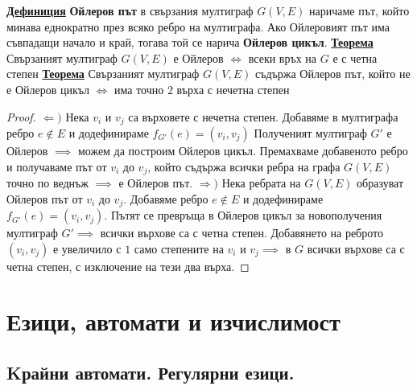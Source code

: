 \documentclass{article}
\begin{document}
\textbf{\underline{Дефиниция}}
\textbf{Ойлеров път} в свързания мултиграф $G(V, E)$ наричаме път, който минава еднократно през всяко ребро на мултиграфа.
Ако Ойлеровият път има съвпадащи начало и край, тогава той се нарича \textbf{Ойлеров цикъл}. \newline\newline
\textbf{\underline{Теорема}} \newline
Свързаният мултиграф $G(V, E)$ е Ойлеров $\iff$ всеки връх на $G$ е с четна степен \newline\newline
\textbf{\underline{Теорема}} \newline
Свързаният мултиграф $G(V, E)$ съдържа Ойлеров път, който не е Ойлеров цикъл $\iff$ има точно $2$ върха с нечетна степен
\begin{proof}
$\Leftarrow)$ Нека $v_i$ и $v_j$ са върховете с нечетна степен. Добавяме в мултиграфа ребро $e \notin E$ и додефинираме
$f_{G'}(e) = (v_i, v_j)$ Полученият мултиграф $G'$ е Ойлеров $\implies$ можем да построим Ойлеров цикъл. Премахваме добавеното
ребро и получаваме път от $v_i$ до $v_j$, който съдържа всички ребра на графа $G(V, E)$ точно по веднъж $\implies$ е Ойлеров път. \newline\newline
$\Rightarrow)$ Нека ребрата на $G(V, E)$ образуват Ойлеров път от $v_i$ до $v_j$. Добавяме ребро $e \notin E$ и додефинираме
$f_{G'}(e) = (v_i, v_j)$. Пътят се превръща в Ойлеров цикъл за новополучения мултиграф $G' \implies$ всички върхове са с четна
степен. Добавянето на реброто $(v_i, v_j)$ е увеличило с $1$ само степените на $v_i$ и $v_j \implies$ в $G$ всички върхове са с
четна степен, с изключение на тези два върха.
\end{proof}

\section*{Езици, автомати и изчислимост}

\subsection*{Kрайни автомати. Регулярни езици.}
\end{document}
